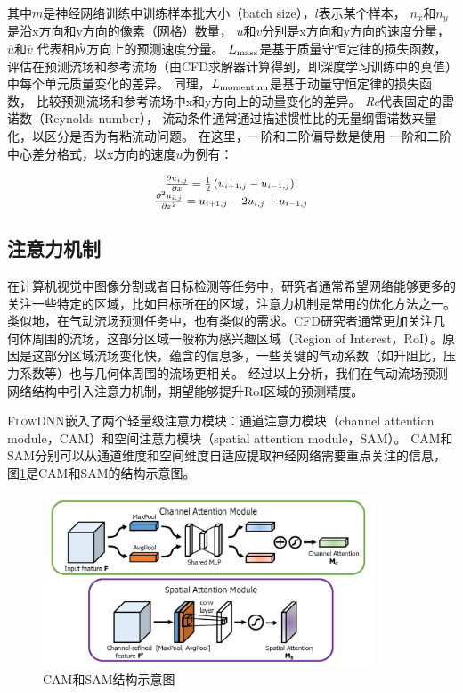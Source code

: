 \noindent 其中$m$是神经网络训练中训练样本批大小（batch size），$l$表示某个样本，
$n_x$和$n_y$是沿x方向和y方向的像素（网格）数量，
$u$和$v$分别是x方向和y方向的速度分量，$\overline u$和$\overline v$
代表相应方向上的预测速度分量。
$L_{\rm {mass}}$是基于质量守恒定律的损失函数，
评估在预测流场和参考流场（由CFD求解器计算得到，即深度学习训练中的真值）中每个单元质量变化的差异。
同理，$L_{\rm {momentum}}$是基于动量守恒定律的损失函数，
比较预测流场和参考流场中x和y方向上的动量变化的差异。 
\textit{Re}代表固定的雷诺数（Reynolds number），
流动条件通常通过描述惯性比的无量纲雷诺数来量化，以区分是否为有粘流动问题。
在这里，一阶和二阶偏导数是使用
一阶和二阶中心差分格式\cite{blazek2015computational}，以x方向的速度$u$为例有：

\begin{align}
	\small
	\begin{array}{*{20}{c}}
		{\frac{{\partial {u_{i,j}}}}{{\partial x}} = \frac{1}{2}\left( {{u_{i + 1,j}} - {u_{i - 1,j}}} \right)};\\
		{\frac{{{\partial ^2}{u_{i,j}}}}{{\partial {x^2}}} = {u_{i + 1,j}} - 2{u_{i,j}} + {u_{i - 1,j}}}  \\
	\end{array}
\end{align}


\subsection{注意力机制}\label{注意力}
在计算机视觉中图像分割或者目标检测等任务中，研究者通常希望网络能够更多的关注一些特定的区域，比如目标所在的区域，注意力机制\cite{Hu2017Squeeze}是常用的优化方法之一。
类似地，在气动流场预测任务中，也有类似的需求。CFD研究者通常更加关注几何体周围的流场，这部分区域一般称为感兴趣区域（Region of  Interest，RoI）。原因是这部分区域流场变化快，蕴含的信息多，一些关键的气动系数（如升阻比，压力系数等）也与几何体周围的流场更相关。
经过以上分析，我们在气动流场预测网络结构中引入注意力机制，期望能够提升RoI区域的预测精度。

\textsc{FlowDNN}嵌入了两个轻量级注意力模块：通道注意力模块（channel attention module，CAM）和空间注意力模块（spatial attention module，SAM）\cite{DBLP:conf/eccv/WooPLK18}。
CAM和SAM分别可以从通道维度和空间维度自适应提取神经网络需要重点关注的信息，
图\ref{fig:am机制}是CAM和SAM的结构示意图。

\begin{figure}[htp]
	\centering
	\includegraphics[width=0.88\textwidth]{figures/am.png}
	\caption{CAM和SAM结构示意图\cite{DBLP:conf/eccv/WooPLK18}}
	\label{fig:am机制}
\end{figure}

